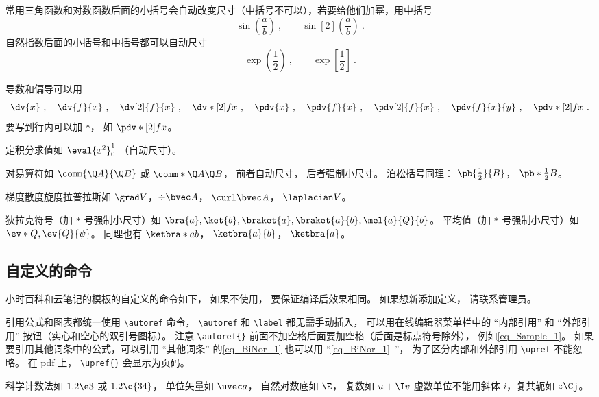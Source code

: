 常用三角函数和对数函数后面的小括号会自动改变尺寸（中括号不可以），若要给他们加幂，用中括号
\begin{equation}
\sin(\frac ab)~, \qquad \sin[2](\frac ab)~.
\end{equation}
自然指数后面的小括号和中括号都可以自动尺寸
\begin{equation}
\exp(\frac12)~, \qquad \exp[\frac12]~.
\end{equation}

导数和偏导可以用
\begin{equation}
\dv{x}~, \quad \dv{f}{x}~, \quad \dv[2]{f}{x}~, \quad \dv*[2]{f}{x}~, \quad
\pdv{x}~, \quad \pdv{f}{x}~, \quad \pdv[2]{f}{x}~, \quad \pdv{f}{x}{y}~, \quad \pdv*[2]{f}{x}~.
\end{equation}
要写到行内可以加 \verb|*|， 如 $\pdv*[2]{f}{x}$。

定积分求值如 $\eval{x^2}_0^1$ （自动尺寸）。

对易算符如 $\comm{\Q A}{\Q B}$ 或 $\comm*{\Q A}{\Q B}$， 前者自动尺寸， 后者强制小尺寸。 泊松括号同理： $\pb{\frac12}{B}$， $\pb*{\frac12}{B}$。

梯度散度旋度拉普拉斯如 $\grad V$，$\div\bvec A$， $\curl\bvec A$， $\laplacian V$。

狄拉克符号（加 \verb|*| 号强制小尺寸）如 $\bra{a}, \ket{b}, \braket{a}, \braket{a}{b}, \mel{a}{Q}{b}$。 平均值（加 \verb|*| 号强制小尺寸）如 $\ev*{Q}, \ev{Q}{\psi}$。 同理也有 $\ketbra*{a}{b}$， $\ketbra{a}{b}$， $\ketbra{a}$。


\subsection{自定义的命令}
小时百科和云笔记的模板的自定义的命令如下， 如果不使用， 要保证编译后效果相同。 如果想新添加定义， 请联系管理员。

引用公式和图表都统一使用 \verb|\autoref| 命令， \verb|\autoref| 和 \verb|\label| 都无需手动插入， 可以用在线编辑器菜单栏中的 “内部引用” 和 “外部引用” 按钮（实心和空心的双引号图标）。 注意 \verb|\autoref{}| 前面不加空格后面要加空格（后面是标点符号除外）， 例如\autoref{eq_Sample_1}。 如果要引用其他词条中的公式，可以引用 “其他词条” 的\autoref{eq_BiNor_1} 也可以用 “\autoref{eq_BiNor_1}~”， 为了区分内部和外部引用 \verb|\upref| 不能忽略。 在 pdf 上， \verb|\upref{}| 会显示为页码。

科学计数法如 $1.2\e3$ 或 $1.2\e{34}$， 单位矢量如 $\uvec a$， 自然对数底如 $\E$， 复数如 $u+\I v$ 虚数单位不能用斜体 $i$，复共轭如 $z\Cj$。

